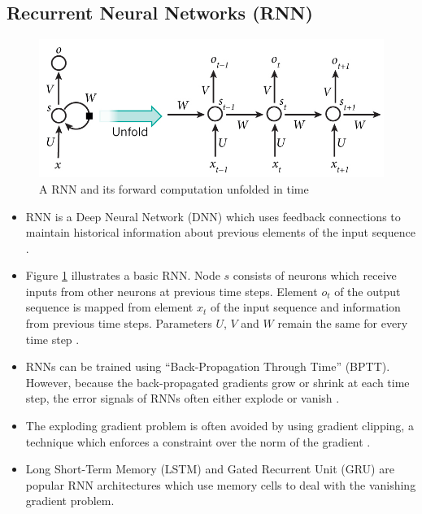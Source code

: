 \subsection{Recurrent Neural Networks (RNN)}
    \begin{figure}[H]
        \centering
        \includegraphics[width=0.8\linewidth]{../images/LeCun2015-deep_learning-fig5_rnn.jpg}
        \caption{A RNN and its forward computation unfolded in time \cite{LeCun2015}} \label{fig:rnn}
    \end{figure}
    \begin{itemize}
        \item RNN is a Deep Neural Network (DNN) which uses feedback connections to maintain historical information about previous elements of the input sequence \cite{Hochreiter:1997:LSM:1246443.1246450, LeCun2015}.
        \item Figure \ref{fig:rnn} illustrates a basic RNN. Node $s$ consists of neurons which receive inputs from other neurons at previous time steps. Element $o_t$ of the output sequence is mapped from element $x_t$ of the input sequence and information from previous time steps. Parameters $U$, $V$ and $W$ remain the same for every time step \cite{LeCun2015}.
        \item RNNs can be trained using ``Back-Propagation Through Time'' (BPTT). However, because the back-propagated gradients grow or shrink at each time step, the error signals of RNNs often either explode or vanish \cite{Hochreiter01gradientflow, LeCun2015}.
        \item The exploding gradient problem is often avoided by using gradient clipping, a technique which enforces a constraint over the norm of the gradient \cite{conf/icml/JozefowiczZS15}.
        \item Long Short-Term Memory (LSTM) and Gated Recurrent Unit (GRU) are popular RNN architectures which use memory cells to deal with the vanishing gradient problem.
    \end{itemize}

